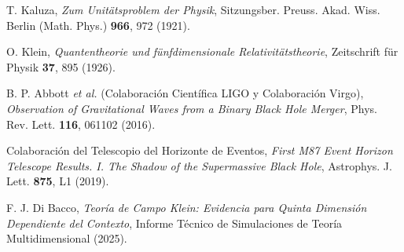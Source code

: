 \documentclass[aps,prl,twocolumn,showpacs,superscriptaddress,groupedaddress]{revtex4-1}
\begin{document}
\begin{thebibliography}{50}

T. Kaluza,
\textit{Zum Unitätsproblem der Physik},
Sitzungsber. Preuss. Akad. Wiss. Berlin (Math. Phys.) \textbf{966}, 972 (1921).

O. Klein,
\textit{Quantentheorie und fünfdimensionale Relativitätstheorie},
Zeitschrift für Physik \textbf{37}, 895 (1926).

B. P. Abbott \textit{et al.} (Colaboración Científica LIGO y Colaboración Virgo),
\textit{Observation of Gravitational Waves from a Binary Black Hole Merger},
Phys. Rev. Lett. \textbf{116}, 061102 (2016).

Colaboración del Telescopio del Horizonte de Eventos,
\textit{First M87 Event Horizon Telescope Results. I. The Shadow of the Supermassive Black Hole},
Astrophys. J. Lett. \textbf{875}, L1 (2019).

F. J. Di Bacco,
\textit{Teoría de Campo Klein: Evidencia para Quinta Dimensión Dependiente del Contexto},
Informe Técnico de Simulaciones de Teoría Multidimensional (2025).

\end{thebibliography}
\end{document}
